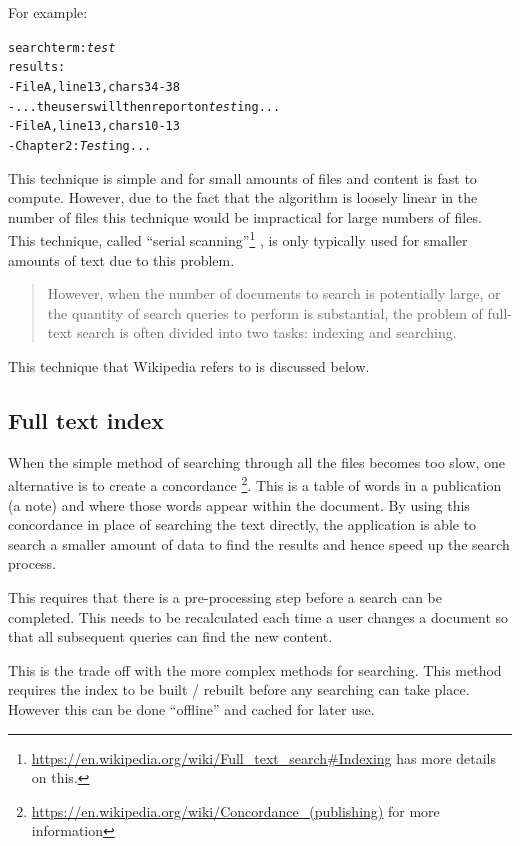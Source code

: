 For example:

\begin{alltt}
    search term: \emph{test}
    results:
    - File A, line 13, chars 34-38
      - ... the users will then report on \emph{test}ing ...
    - File A, line 13, chars 10-13
      - Chapter 2: \emph{Test}ing ...
\end{alltt}

This technique is simple and for small amounts of files and content is fast to
compute. However, due to the fact that the algorithm is loosely linear in the
number of files this technique would be impractical for large numbers of files.
This technique, called ``serial scanning''\footnote{%
\url{https://en.wikipedia.org/wiki/Full_text_search\#Indexing}%
has more details on this.}%
, is only typically used for smaller amounts of text due to this problem.

\blockquote{ However, when the number of documents to search is potentially
large, or the quantity of search queries to perform is substantial, the problem
of full-text search is often divided into two tasks: indexing and searching.
}\cite{wiki:full-text-search}

This technique that Wikipedia refers to is discussed below.

\subsection{Full text index}\label{full-text-index}

When the simple method of searching through all the files becomes too slow, one
alternative is to create a concordance
\footnote{\url{https://en.wikipedia.org/wiki/Concordance_(publishing)} for more
information}. This is a table of words in a publication (a note) and where
those words appear within the document. By using this concordance in place of
searching the text directly, the application is able to search a smaller amount
of data to find the results and hence speed up the search process.

This requires that there is a pre-processing step before a search can be
completed. This needs to be recalculated each time a user changes a
document so that all subsequent queries can find the new content.

This is the trade off with the more complex methods for searching. This method
requires the index to be built / rebuilt before any searching can take place.
However this can be done ``offline'' and cached for later use.

